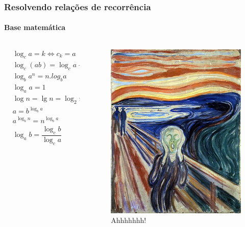 \begin{frame}
	\frametitle{Resolvendo relações de recorrência}
	\framesubtitle{Base matemática}
	\begin{columns}
		\begin{column}{0.5\textwidth}
			\begin{equation}
				\begin{aligned} 
					&\log_ca = k \Leftrightarrow c_k = a\\
					&\log_c(ab) = \log_ca+\log_cb\\
					&\log_ba^n = n.log_ba\\
					&\log_aa=1\\
					&\log n = \lg n = \log_2n\\
					&a = b^{\log_ba}\\
					&a^{\log_bn} = n^{\log_ba}\\
					&\log_ab = \dfrac{\log_cb}{\log_ca}
				\end{aligned}
			\end{equation}
		\end{column}
		\begin{column}{0.5\textwidth}
			\begin{figure}
				\centering
				\includegraphics[width=0.7\linewidth]{images/ogrito}
				\caption{Ahhhhhhh!}
				\label{fig:ogrito}
			\end{figure}
		\end{column}
	\end{columns}
\end{frame}

